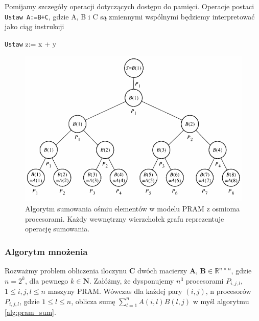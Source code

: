 \begin{uwaga}
Pomijamy szczegóły operacji dotyczących dostępu do pamięci. Operacje postaci \texttt{Ustaw A:=B+C}, gdzie A, B i C są zmiennymi wspólnymi będziemy interpretować jako ciąg instrukcji\\
\begin{algorithm}[H]
\;
\;
\texttt{Ustaw} z:= x + y\;
\;
\end{algorithm}
\end{uwaga}

\begin{figure}[h]
\centering
\includegraphics[width=34em]{./images/pram_sum}
\caption{Algorytm sumowania ośmiu elementów w modelu PRAM z osmioma procesorami. Każdy wewnętrzny wierzchołek grafu reprezentuje operację sumowania.}
\label{fig:pram_sum}
\end{figure}


\subsubsection{Algorytm mnożenia}
Rozważmy problem obliczenia iloczynu \(\mathbf{C}\) dwóch macierzy \(\mathbf{A}\), \(\mathbf{B}\in\mathbb{R}^{n\times n}\), gdzie \(n=2^k\), dla pewnego \(k\in\mathbf{N}\). Załóżmy, że dysponujemy \(n^3\) procesorami \(P_{i,j,l}\), \(1\leq i, j, l \leq n\) maszyny PRAM. Wówczas dla każdej pary \((i, j)\), n procesorów \(P_{i,j,l}\), gdzie \(1\leq l \leq n\), oblicza sumę \(\sum_{l=1}^{n}A(i,l)B(l,j)\) w myśl algorytmu \ref{alg:pram_sum}.\\

